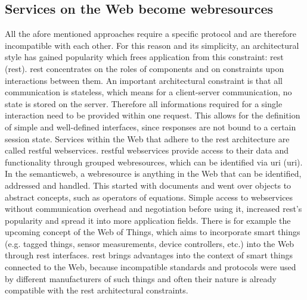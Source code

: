 \subsection{Services on the Web become \glspl{webresource}} %
All the afore mentioned approaches require a specific protocol and are therefore incompatible with each other.
For this reason and its simplicity, an architectural style has gained popularity which frees application from this constraint: \textrm{\acrlong{rest} (\acrshort{rest})}\cite{fielding2000architectural}.
\textrm{\acrshort{rest}} concentrates on the roles of components and on constraints upon interactions between them.
An important architectural constraint is that all communication is stateless, which means for a client-server communication, no state is stored on the server.
Therefore all informations required for a single interaction need to be provided within one request.
This allows for the definition of simple and well-defined interfaces, since responses are not bound to a certain session state. 
Services within the Web that adhere to the \textrm{\acrshort{rest}} architecture are called \textrm{\acrshort{rest}ful \glspl{webservice}}.
\textrm{\acrshort{rest}ful \glspl{webservice}} provide access to their data and functionality through grouped \textrm{\glspl{webresource}}, which can be identified via \textrm{\acrlong{uri} (\acrshort{uri})}\cite{masinter2005uniform}.
In the \textrm{\gls{semanticweb}}\cite{berners2001semantic}, a \gls{webresource} is anything in the Web that can be identified, addressed and handled.
This started with documents and went over objects to abstract concepts, such as operators of equations.
Simple access to \textrm{\glspl{webservice}} without communication overhead and negotiation before using it, increased \textrm{\acrshort{rest}}'s popularity and spread it into more application fields.
There is for example the upcoming concept of the \textrm{Web of Things}\cite{5678452}, which aims to incorporate smart things (e.g. tagged things, sensor measurements, device controllers, etc.) into the Web through \textrm{\acrshort{rest}} interfaces.
\textrm{\acrshort{rest}} brings advantages into the context of smart things connected to the Web, because incompatible standards and protocols were used by different manufacturers of such things and often their nature is already compatible with the \textrm{\acrshort{rest}} architectural constraints.


